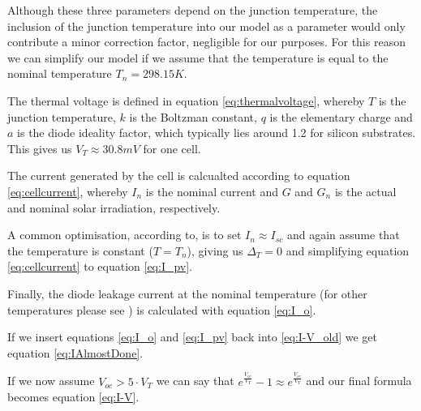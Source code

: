 \begin{minipage}{0.7\textwidth}
    Although these  three parameters depend  on the junction  temperature, the
    inclusion  of the  junction  temperature  into our  model  as a  parameter
    would  only  contribute a  minor  correction  factor, negligible  for  our
    purposes.  For this reason we can simplify our model if we assume that the
    temperature is equal to the nominal temperature $T_n = 298.15K$.

    The  thermal  voltage  is  defined  in  equation  \ref{eq:thermalvoltage},
    whereby $T$ is the junction temperature, $k$ is the Boltzman constant, $q$
    is  the elementary  charge and  $a$ is  the diode  ideality factor,  which
    typically  lies around  1.2  for silicon  substrates. This  gives us  $V_T
    \approx 30.8mV$ for one cell.

    The  current generated  by the  cell is  calcualted according  to equation
    \ref{eq:cellcurrent}, whereby $I_n$  is the nominal current  and $G$ and
    $G_n$ is the actual and nominal solar irradiation, respectively.

    A  common optimisation,  according to\cite{ref:villa:pvmodel},  is to  set
    $I_n \approx  I_{sc}$ and  again assume that  the temperature  is constant
    ($T  =  T_n$),   giving  us  $\Delta_T  =  0$   and  simplifying  equation
    \ref{eq:cellcurrent} to equation \ref{eq:I_pv}.

    Finally, the diode  leakage current at the nominal  temperature (for other
    temperatures  please  see  \cite{ref:villa:pvmodel})  is  calculated  with
    equation \ref{eq:I_o}.

    If  we  insert  equations  \eqref{eq:I_o} and  \eqref{eq:I_pv}  back  into
    \eqref{eq:I-V_old} we get equation \ref{eq:IAlmostDone}.

    If   we  now   assume  $V_{oc}   >   5  \cdot   V_T$  we   can  say   that
    $e^{\frac{V_{oc}}{V_T}}-1  \approx e^{\frac{V_{oc}}{V_T}}$  and our  final
    formula becomes equation \eqref{eq:I-V}.
\end{minipage}

